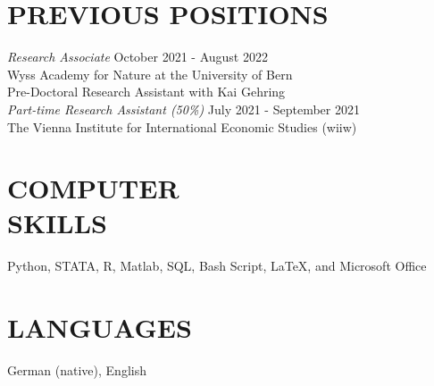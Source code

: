 \documentclass[margin, 12pt]{res} %
\begin{document}
\begin{resume}
		\section{PREVIOUS POSITIONS}
		{\sl Research Associate} \hfill October 2021 - August 2022\\ Wyss Academy for Nature at the University of Bern\\
		Pre-Doctoral Research Assistant with Kai Gehring \vspace{0.2cm} \\
		{\sl Part-time Research Assistant (50\%)} \hfill July 2021 - September 2021\\
		The Vienna Institute for International Economic Studies (wiiw)
		
		\section{COMPUTER \\ SKILLS} 
		
		Python, STATA, R, Matlab, SQL, Bash Script, LaTeX, and Microsoft Office
		
		
		
		\section{LANGUAGES}
		
		German (native), English

		
	\end{resume}
\end{document}
